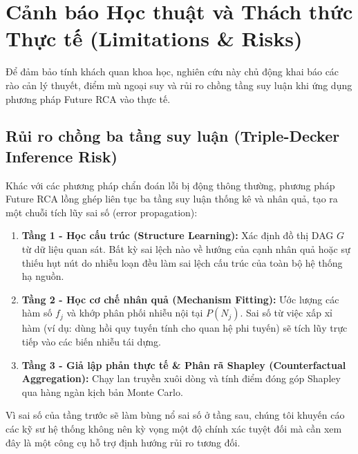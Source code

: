 \documentclass[11pt,a4paper]{article}
\begin{document}
\section{Cảnh báo Học thuật và Thách thức Thực tế (Limitations \& Risks)}

Để đảm bảo tính khách quan khoa học, nghiên cứu này chủ động khai báo các rào cản lý thuyết, điểm mù ngoại suy và rủi ro chồng tầng suy luận khi ứng dụng phương pháp Future RCA vào thực tế.

\subsection{Rủi ro chồng ba tầng suy luận (Triple-Decker Inference Risk)}
Khác với các phương pháp chẩn đoán lỗi bị động thông thường, phương pháp Future RCA lồng ghép liên tục ba tầng suy luận thống kê và nhân quả, tạo ra một chuỗi tích lũy sai số (error propagation):
\begin{enumerate}
    \item \textbf{Tầng 1 - Học cấu trúc (Structure Learning):} Xác định đồ thị DAG $G$ từ dữ liệu quan sát. Bất kỳ sai lệch nào về hướng của cạnh nhân quả hoặc sự thiếu hụt nút do nhiễu loạn đều làm sai lệch cấu trúc của toàn bộ hệ thống hạ nguồn.
    \item \textbf{Tầng 2 - Học cơ chế nhân quả (Mechanism Fitting):} Ước lượng các hàm số $f_j$ và khớp phân phối nhiễu nội tại $P(N_j)$. Sai số từ việc xấp xỉ hàm (ví dụ: dùng hồi quy tuyến tính cho quan hệ phi tuyến) sẽ tích lũy trực tiếp vào các biến nhiễu tái dựng.
    \item \textbf{Tầng 3 - Giả lập phản thực tế \& Phân rã Shapley (Counterfactual Aggregation):} Chạy lan truyền xuôi dòng và tính điểm đóng góp Shapley qua hàng ngàn kịch bản Monte Carlo.
\end{enumerate}
Vì sai số của tầng trước sẽ làm bùng nổ sai số ở tầng sau, chúng tôi khuyến cáo các kỹ sư hệ thống không nên kỳ vọng một độ chính xác tuyệt đối mà cần xem đây là một công cụ hỗ trợ định hướng rủi ro tương đối.
\end{document}
